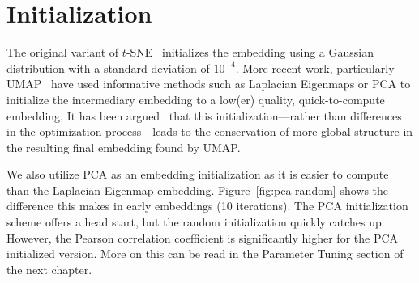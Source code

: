\section{Initialization}

The original variant of $t$-SNE~\cite{tsne} initializes the embedding using a
Gaussian distribution with a standard deviation of $10^{-4}$. More recent work,
particularly UMAP~\cite{umap} have used informative methods such as Laplacian
Eigenmaps or PCA to initialize the intermediary embedding to a low(er) quality,
quick-to-compute embedding. It has been argued~\cite{umap_rebuttal} that this
initialization---rather than differences in the optimization process---leads to
the conservation of more global structure in the resulting final embedding
found by UMAP.

We also utilize PCA as an embedding initialization as it is easier to compute
than the Laplacian Eigenmap embedding.  Figure~\ref{fig:pca-random} shows the
difference this makes in early embeddings (10 iterations). The PCA
initialization scheme offers a head start, but the random initialization
quickly catches up. However, the Pearson correlation coefficient is
significantly higher for the PCA initialized version.  More on this can be read
in the Parameter Tuning section of the next chapter.


